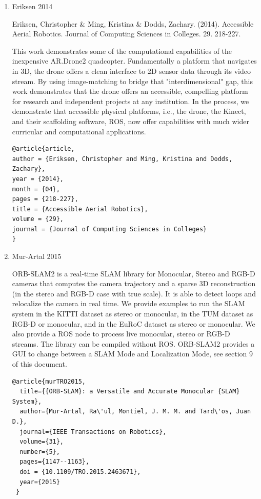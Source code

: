 \documentclass[unrestricted]{meetingnotesminutes}
\begin{document}
\begin{enumerate}
\item Eriksen 2014
\label{sec:org090d9e4}

Eriksen, Christopher \& Ming, Kristina \& Dodds, Zachary. (2014). Accessible Aerial Robotics. Journal of Computing Sciences in Colleges. 29. 218-227.

This work demonstrates some of the computational capabilities of the inexpensive AR.Drone2 quadcopter. Fundamentally a platform that navigates in 3D, the drone offers a clean interface to 2D sensor data through its video stream. By using image-matching to bridge that "interdimensional" gap, this work demonstrates that the drone offers an accessible, compelling platform for research and independent projects at any institution. In the process, we demonstrate that accessible physical platforms, i.e., the drone, the Kinect, and their scaffolding software, ROS, now offer capabilities with much wider curricular and computational applications.

\begin{verbatim}
@article{article,
author = {Eriksen, Christopher and Ming, Kristina and Dodds, Zachary},
year = {2014},
month = {04},
pages = {218-227},
title = {Accessible Aerial Robotics},
volume = {29},
journal = {Journal of Computing Sciences in Colleges}
}
\end{verbatim}


\item Mur-Artal 2015
\label{sec:orgaf6aefe}

ORB-SLAM2 is a real-time SLAM library for Monocular, Stereo and RGB-D cameras that computes the camera trajectory and a sparse 3D reconstruction (in the stereo and RGB-D case with true scale). It is able to detect loops and relocalize the camera in real time. We provide examples to run the SLAM system in the KITTI dataset as stereo or monocular, in the TUM dataset as RGB-D or monocular, and in the EuRoC dataset as stereo or monocular. We also provide a ROS node to process live monocular, stereo or RGB-D streams. The library can be compiled without ROS. ORB-SLAM2 provides a GUI to change between a SLAM Mode and Localization Mode, see section 9 of this document.

\begin{verbatim}
@article{murTRO2015,
  title={{ORB-SLAM}: a Versatile and Accurate Monocular {SLAM} System},
  author={Mur-Artal, Ra\'ul, Montiel, J. M. M. and Tard\'os, Juan D.},
  journal={IEEE Transactions on Robotics},
  volume={31},
  number={5},
  pages={1147--1163},
  doi = {10.1109/TRO.2015.2463671},
  year={2015}
 }
\end{verbatim}
\end{enumerate}
\end{document}
